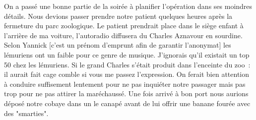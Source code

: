 On a passé une bonne partie de la soirée à planifier l’opération dans ses moindres détails. Nous devions passer prendre notre patient quelques heures après la fermeture du parc zoologique. Le patient prendrait place dans le siège enfant à l’arrière de ma voiture, l’autoradio diffusera du Charles Aznavour en sourdine. Selon Yannick [c’est un prénom d’emprunt afin de garantir l’anonymat] les lémuriens ont un faible pour ce genre de musique. J’ignorais qu’il existait un top 50 chez les lémuriens. Si le grand Charles s’était produit dans l’enceinte du zoo : il aurait fait cage comble si vous me passez l’expression. On ferait bien attention à conduire suffisement lentement pour ne pas inquiéter notre passager mais pas trop pour ne pas attirer la maréchaussé. Une fois arrivé à bon port nous aurions déposé notre cobaye dans un le canapé avant de lui offrir une banane fourée avec des "smarties". 
